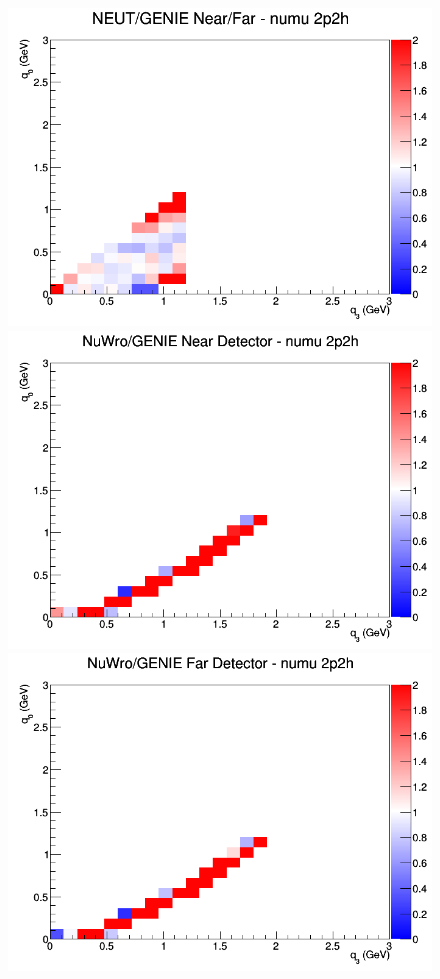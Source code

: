 \documentclass[12pt]{article}
\begin{document}
\begin{figure}[h]
\endminipage
{}
\includegraphics[width=\linewidth]{q0_q3/nominal/ratios/2p2h_NEUT_GENIE_numu_NF_q3_q0.png}
\endminipage
\newline
{}
\includegraphics[width=\linewidth]{q0_q3/nominal/ratios/2p2h_NuWro_GENIE_numu_near_q3_q0.png}
\endminipage
{}
\includegraphics[width=\linewidth]{q0_q3/nominal/ratios/2p2h_NuWro_GENIE_numu_far_q3_q0.png}

\end{figure}
\end{document}
